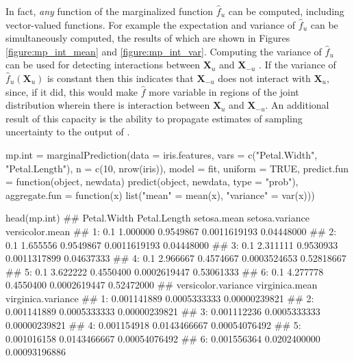 In fact, \textit{any} function of the marginalized function $\hat{f}_u$ can be computed, including vector-valued functions. For example the expectation and variance of $\hat{f}_u$ can be simultaneously computed, the results of which are shown in Figures \ref{figure:mp_int_mean} and \ref{figure:mp_int_var}. Computing the variance of $\hat{f}_u$ can be used for detecting interactions between $\mathbf{X}_u$ and $\mathbf{X}_{-u}$ \citep{goldstein2015peeking}. If the variance of $\hat{f}_u(\mathbf{X}_u)$ is constant then this indicates that $\mathbf{X}_{-u}$ does not interact with $\mathbf{X}_u$, since, if it did, this would make $\hat{f}$ more variable in regions of the joint distribution wherein there is interaction between $\mathbf{X}_u$ and $\mathbf{X}_{-u}$. An additional result of this capacity is the ability to propagate estimates of sampling uncertainty to the output of . 

\begin{example}
mp.int = marginalPrediction(data = iris.features,
  vars = c("Petal.Width", "Petal.Length"),
  n = c(10, nrow(iris)), model = fit, uniform = TRUE,
  predict.fun = function(object, newdata) predict(object, newdata, type = "prob"),
  aggregate.fun = function(x) list("mean" = mean(x), "variance" = var(x)))

head(mp.int)
##    Petal.Width Petal.Length setosa.mean setosa.variance versicolor.mean
## 1:         0.1     1.000000   0.9549867    0.0011619193      0.04448000
## 2:         0.1     1.655556   0.9549867    0.0011619193      0.04448000
## 3:         0.1     2.311111   0.9530933    0.0011317899      0.04637333
## 4:         0.1     2.966667   0.4574667    0.0003524653      0.52818667
## 5:         0.1     3.622222   0.4550400    0.0002619447      0.53061333
## 6:         0.1     4.277778   0.4550400    0.0002619447      0.52472000
##    versicolor.variance virginica.mean virginica.variance
## 1:         0.001141889   0.0005333333      0.00000239821
## 2:         0.001141889   0.0005333333      0.00000239821
## 3:         0.001112236   0.0005333333      0.00000239821
## 4:         0.001154918   0.0143466667      0.00054076492
## 5:         0.001016158   0.0143466667      0.00054076492
## 6:         0.001556364   0.0202400000      0.00093196886  
\end{example}

